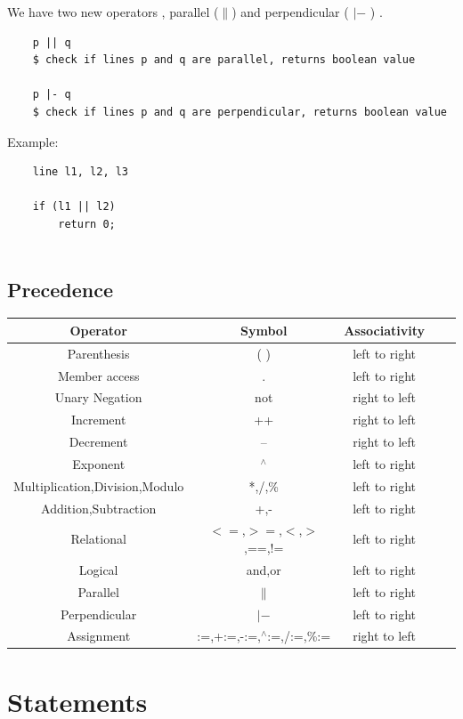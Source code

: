 \documentclass[12pt]{article}
\begin{document}
We have two new operators , parallel ($\parallel$) and perpendicular ( $|-$ ) .
\begin{verbatim}
    p || q              
    $ check if lines p and q are parallel, returns boolean value 

    p |- q
    $ check if lines p and q are perpendicular, returns boolean value 
\end{verbatim}
Example:
\begin{verbatim}
    line l1, l2, l3 

    if (l1 || l2)
        return 0;
        
\end{verbatim}
\subsection{Precedence}
\begin{center}
\begin{tabular}{ | c | c | c| c | c |} 
  \hline
  Operator & Symbol & Associativity \\ 
  \hline
Parenthesis & ( ) & left to right  \\
Member access & . & left to right \\
Unary Negation & not & right to left  \\
Increment & ++ & right to left  \\
Decrement & -- & right to left  \\
Exponent & ${}^\wedge$ & left to right  \\
Multiplication,Division,Modulo & *,/,\% & left to right  \\
Addition,Subtraction & +,- & left to right  \\
Relational & $<=$,$>=$,$<$,$>$,==,!= & left to right  \\
Logical & and,or & left to right  \\
Parallel & $\parallel$ & left to right  \\
Perpendicular & $|-$ & left to right  \\
Assignment  & :=,+:=,-:=,${}^\wedge$:=,/:=,\%:= & right to left  \\
\hline
\end{tabular}
\end{center}

\section{Statements}
\end{document}
